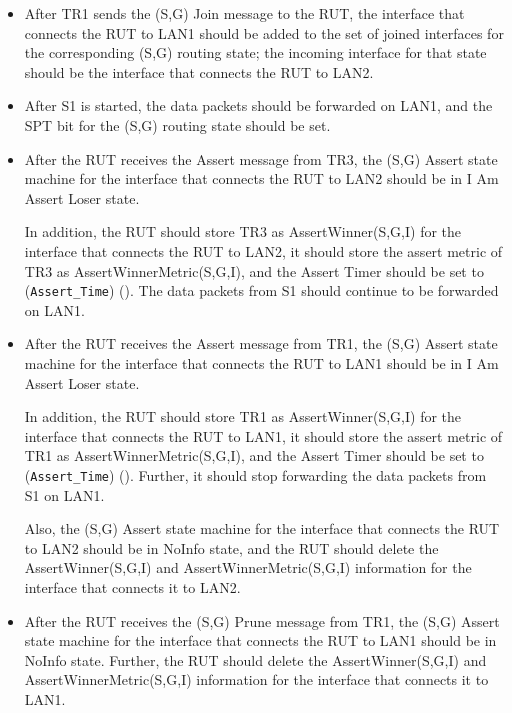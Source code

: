 \documentclass[11pt]{report}
\begin{document}
\begin{itemize}

  \item After TR1 sends the (S,G) Join message to the RUT, the interface that
  connects the RUT to LAN1 should be added to the set of joined interfaces for
  the corresponding (S,G) routing state; the incoming interface for that state
  should be the interface that connects the RUT to LAN2.

  \item After S1 is started, the data packets should be forwarded on LAN1,
  and the SPT bit for the (S,G) routing state should be set.

  \item After the RUT receives the Assert message from TR3, the (S,G)
  Assert state machine for the interface that connects the RUT to LAN2 should
  be in I Am Assert Loser state.

  In addition, the RUT should store TR3 as AssertWinner(S,G,I) for the
  interface that connects the RUT to LAN2, it should store the assert metric
  of TR3 as AssertWinnerMetric(S,G,I), and the Assert Timer should be set to
  (\verb=Assert_Time=) ({\PimsmAssertTime}).
  The data packets from S1 should continue to be forwarded on LAN1.

  \item After the RUT receives the Assert message from TR1, the (S,G)
  Assert state machine for the interface that connects the RUT to LAN1 should
  be in I Am Assert Loser state.

  In addition, the RUT should store TR1 as AssertWinner(S,G,I) for the
  interface that connects the RUT to LAN1, it should store the assert metric
  of TR1 as AssertWinnerMetric(S,G,I), and the Assert Timer should be set to
  (\verb=Assert_Time=) ({\PimsmAssertTime}).
  Further, it should stop forwarding the data packets from S1 on LAN1.

  Also, the (S,G) Assert state machine for the interface that connects the RUT
  to LAN2 should be in NoInfo state, and the RUT should delete the
  AssertWinner(S,G,I) and AssertWinnerMetric(S,G,I) information for the
  interface that connects it to LAN2.

  \item After the RUT receives the (S,G) Prune message from TR1, the (S,G)
  Assert state machine for the interface that connects the RUT to LAN1 should
  be in NoInfo state.
  Further, the RUT should delete the AssertWinner(S,G,I) and
  AssertWinnerMetric(S,G,I) information for the interface that connects it to
  LAN1.

\end{itemize}
\end{document}
